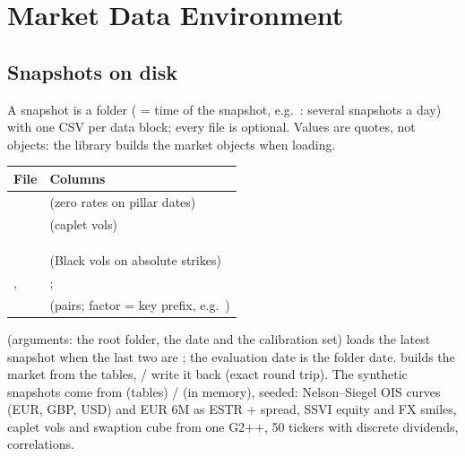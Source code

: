 \section{Market Data Environment}\label{sec:arch-market-data-environment}\label{sec:arch-market-environment}

\subsection{Snapshots on disk}\label{sec:arch-snapshots}\label{sec:arch-market-data}
A snapshot is a folder  ( = time of the
snapshot, e.g.\ : several snapshots a day) with one CSV per data block; every file is optional.
Values are quotes, not objects: the library builds the market objects when loading.

\begin{center}
\small
\begin{tabular}{@{}L{3.6cm}L{11.6cm}@{}}
\toprule
File & Columns \\
\midrule
{} &  (zero rates on pillar dates) \\
 &  (caplet vols) \\
 &  \\
 &  \\
 &  \\
 &  (Black vols on absolute strikes) \\
,  & ;  \\
 &  (pairs; factor = key prefix, e.g.\ ) \\
\bottomrule
\end{tabular}
\end{center}

 (arguments: the root folder, the date and the calibration set) loads
the latest snapshot when the last two are ; the evaluation date is the folder date.  builds the market
from the tables,  /  write it back (exact round trip). The synthetic snapshots
come from  (tables) /  (in memory), seeded:
Nelson--Siegel OIS curves (EUR, GBP, USD) and EUR 6M as ESTR + spread, SSVI equity and FX smiles, caplet vols and
swaption cube from one G2++, 50 tickers with discrete dividends, correlations.

